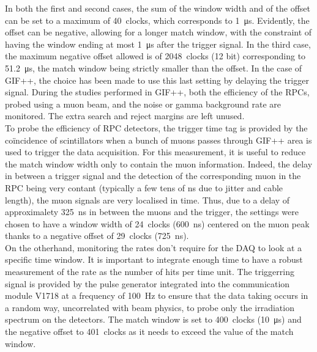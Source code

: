 	In both the first and second cases, the sum of the window width and of the offset can be set to a maximum of \SI{40}{clocks}, which corresponds to \SI{1}{\micro s}. Evidently, the offset can be negative, allowing for a longer match window, with the constraint of having the window ending at most \SI{1}{\micro s} after the trigger signal. In the third case, the maximum negative offset allowed is of \SI{2048}{clocks} (12 bit) corresponding to \SI{51.2}{\micro s}, the match window being strictly smaller than the offset. In the case of GIF++, the choice has been made to use this last setting by delaying the trigger signal. During the studies performed in GIF++, both the efficiency of the RPCs, probed using a muon beam, and the noise or gamma background rate are monitored. The extra search and reject margins are left unused.\\
	To probe the efficiency of RPC detectors, the trigger time tag is provided by the coïncidence of scintillators when a bunch of muons passes through GIF++ area is used to trigger the data acquisition. For this measurement, it is useful to reduce the match window width only to contain the muon information. Indeed, the delay in between a trigger signal and the detection of the corresponding muon in the RPC being very contant (typically a few tens of ns due to jitter and cable length), the muon signals are very localised in time. Thus, due to a delay of approximalety \SI{325}{ns} in between the muons and the trigger, the settings were chosen to have a window width of \SI{24}{clocks} (\SI{600}{ns}) centered on the muon peak thanks to a negative offset of \SI{29}{clocks} (\SI{725}{ns}).\\
	On the otherhand, monitoring the rates don't require for the DAQ to look at a specific time window. It is important to integrate enough time to have a robust measurement of the rate as the number of hits per time unit. The triggerring signal is provided by the pulse generator integrated into the communication module V1718 at a frequency of \SI{100}{Hz} to ensure that the data taking occurs in a random way, uncorrelated with beam physics, to probe only the irradiation spectrum on the detectors. The match window is set to \SI{400}{clocks} (\SI{10}{\micro s}) and the negative offset to \SI{401}{clocks} as it needs to exceed the value of the match window.\\
	
